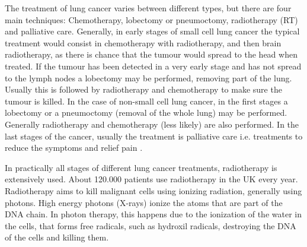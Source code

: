 The treatment of lung cancer varies between different types, but there are four main techniques: Chemotherapy, lobectomy or pneumoctomy, radiotherapy (RT) and palliative care. Generally, in early stages of small cell lung cancer the typical treatment would consist in chemotherapy with radiotherapy, and then brain radiotherapy, as there is chance that the tumour would spread to the head when treated. If the tumour has been detected in a very early stage and has not spread to the lymph nodes a lobectomy may be performed, removing part of the lung. Usually this is followed by radiotherapy and chemotherapy to make sure the tumour is killed.
In the case of non-small cell lung cancer, in the first stages a lobectomy or a pneumoctomy (removal of the whole lung) may be performed. Generally radiotherapy and chemotherapy (less likely) are also performed. In the last stages of the cancer, usually the treatment is palliative care i.e. treatments to reduce the symptoms and relief pain \citep{CRUK2014b}.

In practically all stages of different lung cancer treatments, radiotherapy is extensively used. About 120.000 patients use radiotherapy in the UK every year. Radiotherapy aims to kill malignant cells using ionizing radiation, generally using photons. High energy photons (X-rays) ionize the atoms that are part of the DNA chain. In photon therapy, this happens due to the ionization of the water in the cells, that forms free radicals, such as hydroxil radicals, destroying the DNA of the cells and killing them.